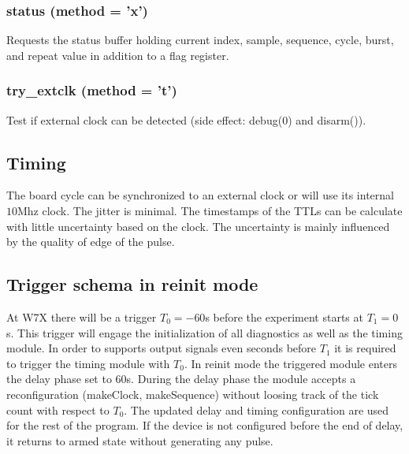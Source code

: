\documentclass{article}
\begin{document}
\subsubsection*{status (method = 'x')}
Requests the status buffer holding current index, sample, sequence, cycle, burst, and repeat value in addition to a flag register. 
\subsubsection*{try\_extclk (method = 't')}
Test if external clock can be detected (side effect: debug(0) and disarm()). 

\subsection*{Timing}
The board cycle can be synchronized to an external clock or will use its internal $10$Mhz clock.
The jitter is minimal. The timestamps of the TTLs can be calculate with little uncertainty based on the clock. The uncertainty is mainly influenced by the quality of edge of the pulse.

\subsection*{Trigger schema in reinit mode}
At W7X there will be a trigger $T_0=-60$s before the experiment starts at $T_1=0$s. This trigger will engage the initialization of all diagnostics as well as the timing module. In order to supports output signals even seconds before $T_1$ it is required to trigger the timing module with $T_0$. In reinit mode the triggered module enters the delay phase set to $60$s. During the delay phase the module accepts a reconfiguration (makeClock, makeSequence) without loosing track of the tick count with respect to $T_0$. The updated delay and timing configuration are used for the rest of the program. If the device is not configured before the end of delay, it returns to armed state without generating any pulse.
\end{document}
